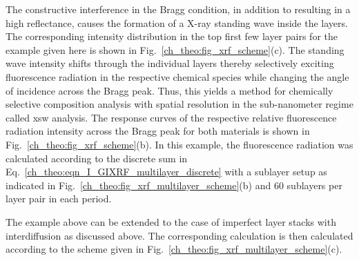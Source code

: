 The constructive interference in the Bragg condition, in addition to resulting in a high reflectance, causes the formation of a X-ray standing wave inside the layers. The corresponding intensity distribution in the top first few layer pairs for the example given here is shown in Fig.~\ref{ch_theo:fig_xrf_scheme}(c). The standing wave intensity shifts through the individual layers thereby selectively exciting fluorescence radiation in the respective chemical species while changing the angle of incidence across the Bragg peak. Thus, this yields a method for chemically selective composition analysis with spatial resolution in the sub-nanometer regime called \gls{xsw} analysis. The response curves of the respective relative fluorescence radiation intensity across the Bragg peak for both materials is shown in Fig.~\ref{ch_theo:fig_xrf_scheme}(b). In this example, the fluorescence radiation was calculated according to the discrete sum in Eq.~\eqref{ch_theo:eqn_I_GIXRF_multilayer_discrete} with a sublayer setup as indicated in Fig.~\ref{ch_theo:fig_xrf_multilayer_scheme}(b) and $60$ sublayers per layer pair in each period.

The example above can be extended to the case of imperfect layer stacks with interdiffusion as discussed above. The corresponding calculation is then calculated according to the scheme given in Fig.~\ref{ch_theo:fig_xrf_multilayer_scheme}(c).



